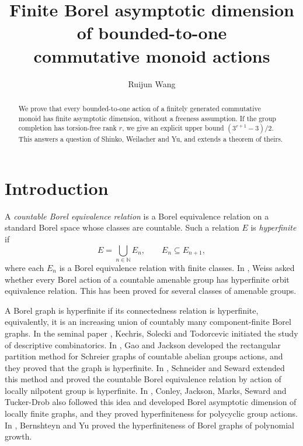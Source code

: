 \documentclass[11pt,letterpaper]{article}
\title{Finite Borel asymptotic dimension of bounded-to-one\texorpdfstring{\\}{ }commutative monoid actions}
\author{Ruijun Wang}
\date{}
\theoremstyle{definition}
\newcommand{\NN}{\mathbb N}
\begin{document}
\maketitle
\vspace{-1.5em}
\begin{abstract}
We prove that every bounded-to-one action of a finitely generated
commutative monoid has finite asymptotic dimension, without a freeness
assumption. If the group completion has torsion-free rank $r$, we
give an explicit upper bound $(3^{r+1}-3)/2$. This answers a question of
Shinko, Weilacher and Yu, and extends a theorem of theirs.
\end{abstract}

\section{Introduction}

A \emph{countable Borel equivalence relation} is a Borel equivalence
relation on a standard Borel space whose classes are countable. Such a
relation $E$ is \emph{hyperfinite} if
\[
 E=\bigcup_{n\in\NN}E_n,
 \qquad E_n\subseteq E_{n+1},
\]
where each $E_n$ is a Borel equivalence relation with finite classes.
In \cite{weiss1984}, Weiss asked whether every Borel action of a countable
amenable group has hyperfinite orbit equivalence relation. This has been
proved for several classes of amenable groups.

A Borel graph is hyperfinite if its connectedness relation is hyperfinite, equivalently, it is an increasing union of countably many component-finite Borel graphs. In the seminal paper \cite{KST1999}, Kechris, Solecki and Todorcevic initiated the study of descriptive combinatorics. In \cite{GJ2015}, Gao and Jackson developed the rectangular partition method for Schreier graphs of countable abelian groups actions, and they proved that the graph is hyperfinite. In \cite{SchneiderSeward2024}, Schneider and Seward extended this method and proved the countable Borel equivalence relation by action of locally nilpotent group is hyperfinite. In \cite{CJMST}, Conley, Jackson, Marks, Seward and Tucker-Drob also followed this idea and developed Borel asymptotic dimension of locally finite graphs, and they proved hyperfiniteness for polycyclic group actions. In \cite{BY}, Bernshteyn and Yu proved the hyperfiniteness of Borel graphs of polynomial growth.
\end{document}
